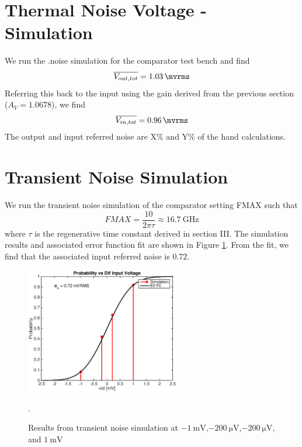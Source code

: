\documentclass[letterpaper, notitlepage]{revtex4-1}
\begin{document}
\section{Thermal Noise Voltage - Simulation}
We run the .noise simulation for the comparator test bench and find
\begin{equation}
\overline{V_{out,tot}}=\SI{1.03}{\mvrms}
\end{equation}
Referring this back to the input using the gain derived from the previous section ($A_V=1.0678$), we find
\begin{equation}
\overline{V_{in,tot}}=\SI{0.96}{\mvrms}
\end{equation}
The output and input referred noise are X\% and Y\% of the hand calculations. 

\section{Transient Noise Simulation}
We run the transient noise simulation of the comparator setting FMAX such that
\begin{equation}
FMAX=\frac{10}{2\pi\tau}\approx\SI{16.7}{\giga\hertz}
\end{equation}
where $\tau$ is the regenerative time constant derived in section III. The simulation results and associated error function fit are shown in Figure \ref{fig:TransientNoise}. From the fit, we find that the associated input referred noise is \SI{0.72}{\mvrms}.

\begin{figure}[h]
\begin{center}
\includegraphics[width=0.6\textwidth]{Part_G.eps}
\caption{Results from transient noise simulation at $\SI{-1}{\milli\volt}$,$\SI{-200}{\micro\volt}$,$\SI{-200}{\micro\volt}$, and $\SI{1}{\milli\volt}$}. 
\label{fig:TransientNoise}
\end{center}
\end{figure}
\end{document}
